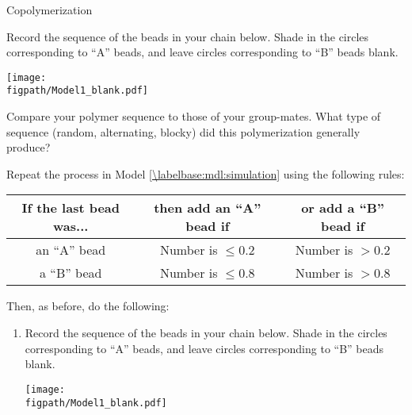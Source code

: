 \begin{activity}{Copolymerization}
\begin{model}
\end{model}


\begin{ctqs}

	\question \label{\labelbase:ctq:sim-random} Record the sequence of the beads in your chain below.  Shade in the circles corresponding to ``A'' beads, and leave circles corresponding to ``B'' beads blank.
	
		\vspace{6pt}
		\centerline{\texttt{[image: \\figpath/Model1\_blank.pdf]}}
	
	\question Compare your polymer sequence to those of your group-mates.  What type of sequence (random, alternating, blocky) did this polymerization generally produce?
		
		\begin{solution}[1in]\end{solution}
	
	\question \label{\labelbase:ctq:sim-alternating} Repeat the process in Model \ref{\labelbase:mdl:simulation} using the following rules:	\begin{center}
					\renewcommand{\arraystretch}{1.5}
					\begin{tabular}{|c|c|c|}
						\hline
						\textbf{If the last bead was...} &  \textbf{then add an ``A'' bead if} & \textbf{or add a ``B'' bead if}\\\hline
						 an ``A'' bead & Number is $\leq 0.2$ & Number is $> 0.2$ \\\hline
						 a ``B'' bead & Number is $\leq 0.8$ & Number is $> 0.8$ \\\hline
					\end{tabular}
					\end{center}
	
		Then, as before, do the following:
		\begin{enumerate}
			\item Record the sequence of the beads in your chain below.  Shade in the circles corresponding to ``A'' beads, and leave circles corresponding to ``B'' beads blank.
	
		\vspace{6pt}
		\centerline{\texttt{[image: \\figpath/Model1\_blank.pdf]}}
	

\end{enumerate}
\end{ctqs}
\end{activity}
